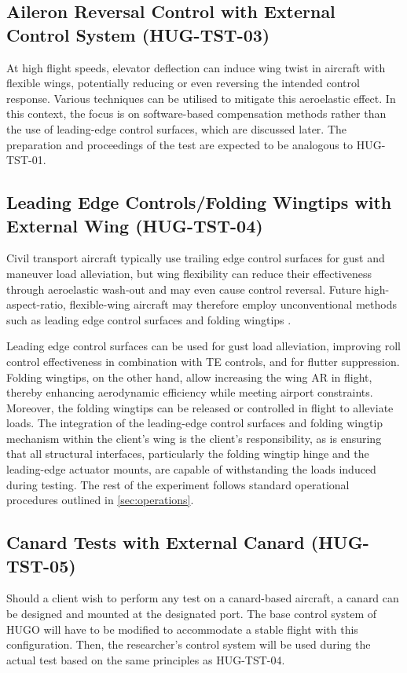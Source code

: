 \subsection{Aileron Reversal Control with External Control System (HUG-TST-03)}

At high flight speeds, elevator deflection can induce wing twist in aircraft with flexible wings, potentially reducing or even reversing the intended control response. Various techniques can be utilised to mitigate this aeroelastic effect. In this context, the focus is on software-based compensation methods rather than the use of leading-edge control surfaces, which are discussed later. The preparation and proceedings of the test are expected to be analogous to HUG-TST-01.


\subsection{Leading Edge Controls/Folding Wingtips with External Wing (HUG-TST-04)}

Civil transport aircraft typically use trailing edge control surfaces for gust and maneuver load alleviation, but wing flexibility can reduce their effectiveness through aeroelastic wash-out and may even cause control reversal. Future high-aspect-ratio, flexible-wing aircraft may therefore employ unconventional methods such as leading edge control surfaces and folding wingtips \cite{Sanghi2022}. 

Leading edge control surfaces can be used for gust load alleviation, improving roll control effectiveness in combination with TE controls, and for flutter suppression. Folding wingtips, on the other hand, allow increasing the wing AR in flight, thereby enhancing aerodynamic efficiency while meeting airport constraints. Moreover, the folding wingtips can be released or controlled in flight to alleviate loads. The integration of the leading-edge control surfaces and folding wingtip mechanism within the client's wing is the client's responsibility, as is ensuring that all structural interfaces, particularly the folding wingtip hinge and the leading-edge actuator mounts, are capable of withstanding the loads induced during testing. The rest of the experiment follows standard operational procedures outlined in \autoref{sec:operations}.



\subsection{Canard Tests with External Canard (HUG-TST-05)}
Should a client wish to perform any test on a canard-based aircraft, a canard can be designed and mounted at the designated port. The base control system of HUGO will have to be modified to accommodate a stable flight with this configuration. Then, the researcher’s control system will be used during the actual test based on the same principles as HUG-TST-04.



